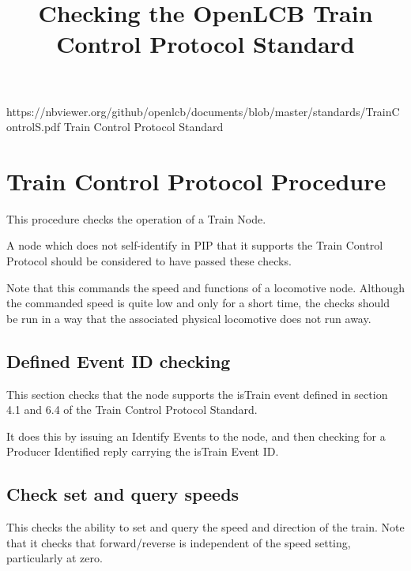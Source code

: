 

\title{Checking the OpenLCB Train Control Protocol Standard}


\maketitle


\introductionCaveats
    {https://nbviewer.org/github/openlcb/documents/blob/master/standards/TrainControlS.pdf}
    {Train Control Protocol Standard}

\section{Train Control Protocol Procedure}


This procedure checks the operation of a Train Node.  

A node which does not self-identify in PIP that it supports
the Train Control Protocol should be considered to have passed these checks.
\pipsetFootnote

Note that this commands the speed and functions of a locomotive node.
Although the commanded speed is quite low and only for a short time, the
checks should be run in a way that the associated physical locomotive
does not run away.

\subsection{Defined Event ID checking}

This section checks that the node supports the isTrain event
defined in section 4.1 and 6.4 of the Train Control Protocol Standard.

It does this by issuing an Identify Events to the node, and then
checking for a Producer Identified reply carrying the isTrain Event ID.

\subsection{Check set and query speeds}

This checks the ability to set and query the speed and direction of the train.
Note that it checks that forward/reverse is independent of the speed setting, particularly
at zero.

